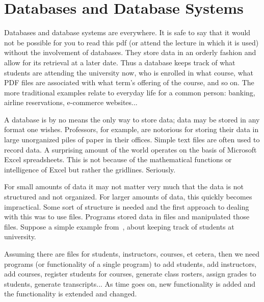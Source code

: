 




\section*{Databases and Database Systems}

Databases and database systems are everywhere. It is safe to say that it would not be possible for you to read this pdf (or attend the lecture in which it is used) without the involvement of databases. They store data in an orderly fashion and allow for its retrieval at a later date. Thus a database keeps track of what students are attending the university now, who is enrolled in what course, what PDF files are associated with what term's offering of the course, and so on. The more traditional examples relate to everyday life for a common person: banking, airline reservations, e-commerce websites...

A database is by no means the only way to store data; data may be stored in any format one wishes. Professors, for example, are notorious for storing their data in large unorganized piles of paper in their offices. Simple text files are often used to record data. A surprising amount of the world operates on the basis of Microsoft Excel spreadsheets. This is not because of the mathematical functions or intelligence of Excel but rather the gridlines. Seriously.

For small amounts of data it may not matter very much that the data is not structured and not organized. For larger amounts of data, this quickly becomes impractical. Some sort of structure is needed and the first approach to dealing with this was to use files. Programs stored data in files and manipulated those files. Suppose a simple example from~\cite{dsc}, about keeping track of students at university.

Assuming there are files for students, instructors, courses, et cetera, then we need programs (or functionality of a single program) to add students, add instructors, add courses, register students for courses, generate class rosters, assign grades to students, generate transcripts... As time goes on, new functionality is added and the functionality is extended and changed.

